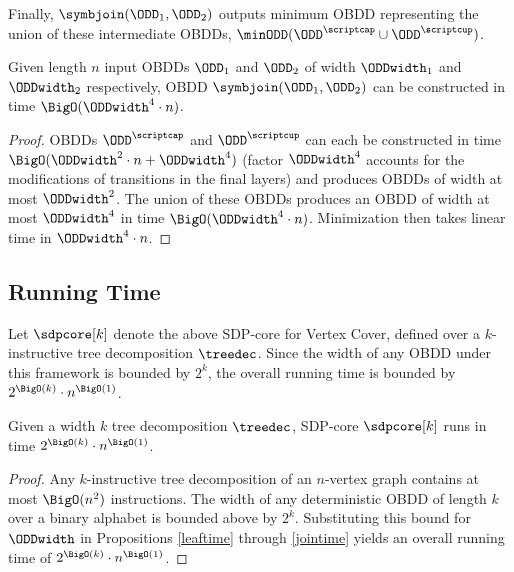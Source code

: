 Finally, $\symbjoin(\ODD_1,\ODD_2)$ outputs minimum OBDD representing the union of these intermediate OBDDs, $\minODD(\ODD^{\scriptcap} \cup \ODD^{\scriptcup})$.

\begin{proposition}\label{jointime}
    Given length $n$ input OBDDs $\ODD_1$ and $\ODD_2$ of width $\ODDwidth_1$ and $\ODDwidth_2$ respectively, OBDD $\symbjoin(\ODD_1, \ODD_2)$ can be constructed in time ${\BigO(\ODDwidth^4\cdot n)}$. 
\end{proposition}
\begin{proof}
    OBDDs $\ODD^{\scriptcap} $ and $\ODD^{\scriptcup}$ can each be constructed in time $\BigO(\ODDwidth^2\cdot n + \ODDwidth^4)$ (factor $\ODDwidth^4$ accounts for the modifications of transitions in the final layers) and produces OBDDs of width at most $\ODDwidth^2$. The union of these OBDDs produces an OBDD of width at most $\ODDwidth^4$ in time $\BigO(\ODDwidth^4\cdot n)$. Minimization then takes linear time in $\ODDwidth^4\cdot n$.
\end{proof}


\subsection{Running Time}

Let $\sdpcore[k]$ denote the above SDP-core for {\sc Vertex Cover},
defined over a $k$-instructive tree decomposition $\treedec$. Since the width
of any OBDD under this framework is bounded by $2^k$, the overall running time
is bounded by $2^{\BigO(k)} \cdot n^{\BigO(1)}$.

\begin{proposition}
    Given a width $k$ tree decomposition $\treedec$, SDP-core $\sdpcore[k]$ runs in time $2^{\BigO(k)}\cdot n^{\BigO(1)}$.
\end{proposition}
\begin{proof}
   Any $k$-instructive tree decomposition of an $n$-vertex graph contains at most
$\BigO(n^2)$ instructions. The width of any deterministic OBDD of length $k$
over a binary alphabet is bounded above by $2^k$. Substituting this bound for
$\ODDwidth$ in Propositions \ref{leaftime} through \ref{jointime} yields an overall running time of
$2^{\BigO(k)} \cdot n^{\BigO(1)}$.
\end{proof}
